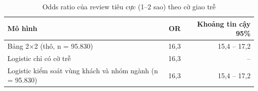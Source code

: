 \begin{table}[htbp]\centering\scriptsize\caption{Odds ratio của review tiêu cực (1--2 sao) theo cờ giao trễ}\label{tab:p12c-or}
\begin{tabular}{p{6.2cm}rr}\toprule
\textbf{Mô hình} & \textbf{OR} & \textbf{Khoảng tin cậy 95\%}\\\midrule
Bảng 2$\times$2 (thô, n = 95.830) & 16,3 & 15,4 -- 17,2\\
Logistic chỉ có cờ trễ & 16,3 & --\\
Logistic kiểm soát vùng khách và nhóm ngành (n = 95.830) & 16,3 & 15,4 -- 17,2\\
\bottomrule\end{tabular}\end{table}
